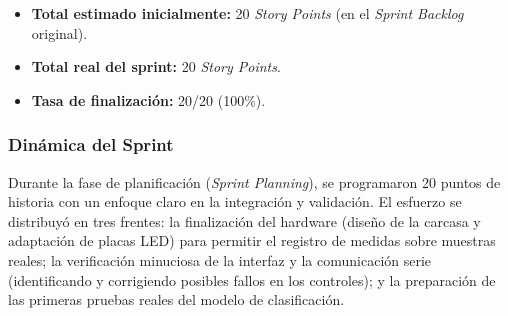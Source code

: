 \begin{table}[H]
    \centering
    \caption{Catálogo de tareas del Sprint 4.}
\end{table}

\begin{itemize}
    \item \textbf{Total estimado inicialmente:} 20 \textit{Story Points} (en el \textit{Sprint Backlog} original).
    \item \textbf{Total real del sprint:} 20 \textit{Story Points}.
    \item \textbf{Tasa de finalización:} 20/20 (100\%).
\end{itemize}

\subsubsection{Dinámica del Sprint}
Durante la fase de planificación (\textit{Sprint Planning}), se programaron 20 puntos de historia con un enfoque claro en la integración y validación. El esfuerzo se distribuyó en tres frentes: la finalización del hardware (diseño de la carcasa y adaptación de placas LED) para permitir el registro de medidas sobre muestras reales; la verificación minuciosa de la interfaz y la comunicación serie (identificando y corrigiendo posibles fallos en los controles); y la preparación de las primeras pruebas reales del modelo de clasificación.

